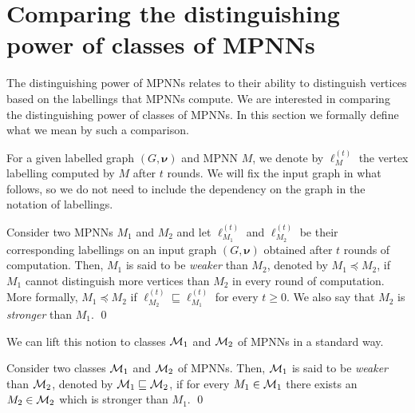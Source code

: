 \section{Comparing the distinguishing power of classes of MPNNs}\label{subsec:compare}
The distinguishing power of MPNNs relates to their ability to distinguish vertices based on the labellings that MPNNs compute. We are interested in comparing the distinguishing power of classes of MPNNs. In this section we formally define what we
mean by such a comparison.

For a given labelled graph $( G,\pmb{\nu})$ and MPNN $M$, we denote by 
$\pmb{\ell}_M^{(t)}$ the vertex labelling computed by $M$ after $t$ rounds. We will fix the input graph in what follows, so we do not need to include the dependency on the graph in the notation of labellings.

\begin{definition}\label{def:mpnnweak}\normalfont
Consider two MPNNs $M_1$ and $M_2$ and let $\pmb{\ell}_{M_1}^{(t)}$ and $\pmb{\ell}_{M_2}^{(t)}$  be their corresponding labellings on an input graph $( G,\pmb{\nu})$ obtained after $t$ rounds of computation. Then,
$M_1$ is said to be \textit{weaker} than $M_2$, denoted by $M_1\preceq M_2$, if $M_1$ cannot distinguish more vertices  than $M_2$ in every round of computation. More formally, $M_1\preceq M_2$ if $\pmb{\ell}_{M_2}^{(t)}\sqsubseteq
\pmb{\ell}_{M_1}^{(t)}$ for every $t\geq 0$. We also say that $M_2$ is \textit{stronger} than $M_1$. \qed
\end{definition}
We can lift this notion to classes  $\mathcal{M}_1$ and $\mathcal{M}_2$ of MPNNs in a standard way. 

\begin{definition}\label{def:classesweak}\normalfont
Consider two classes $\mathcal{M}_1$ and $\mathcal{M}_2$ of MPNNs.
Then, $\mathcal{M}_1$ is said to be \textit{weaker} than $\mathcal{M}_2$, denoted by 
$\mathcal{M}_1\sqsubseteq \mathcal{M}_2$, if for every $M_1\in \mathcal{M}_1$
there exists an $M_2\in\mathcal{M}_2$ which is stronger than $M_1$. \qed
\end{definition}

